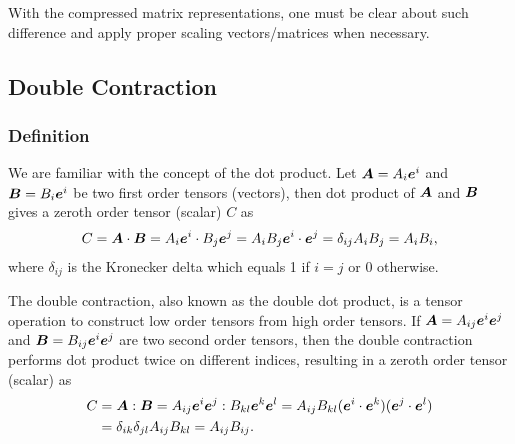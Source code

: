 With the compressed matrix representations, one must be clear about such difference and apply proper scaling vectors/matrices when necessary.
\subsection{Double Contraction}
\subsubsection{Definition}
We are familiar with the concept of the dot product. Let $\bm{A}=A_i\bm{e}^i$ and $\bm{B}=B_i\bm{e}^i$ be two first order tensors (vectors), then dot product of $\bm{A}$ and $\bm{B}$ gives a zeroth order tensor (scalar) $C$ as
\begin{gather}
C=\bm{A}\cdot\bm{B}=A_i\bm{e}^i\cdot{}B_j\bm{e}^j=A_iB_j\bm{e}^i\cdot\bm{e}^j=\delta_{ij}A_iB_j=A_iB_i,
\end{gather}
where $\delta_{ij}$ is the Kronecker delta which equals \num{1} if $i=j$ or \num{0} otherwise.

The double contraction, also known as the double dot product, is a tensor operation to construct low order tensors from high order tensors.
If $\bm{A}=A_{ij}\bm{e}^i\bm{e}^j$ and $\bm{B}=B_{ij}\bm{e}^i\bm{e}^j$ are two second order tensors, then the double contraction performs dot product twice on different indices, resulting in a zeroth order tensor (scalar) as
\begin{gather}\label{eq:double_contraction}
\begin{split}
C&=\bm{A}:\bm{B}=A_{ij}\bm{e}^i\bm{e}^j:B_{kl}\bm{e}^k\bm{e}^l=A_{ij}B_{kl}(\bm{e}^i\cdot\bm{e}^k)(\bm{e}^j\cdot\bm{e}^l)\\&=\delta_{ik}\delta_{jl}A_{ij}B_{kl}=A_{ij}B_{ij}.
\end{split}
\end{gather}
